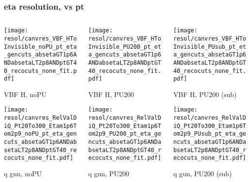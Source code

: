 \documentclass[8pt]{beamer}
\begin{document}
  \begin{frame}
  \frametitle{eta resolution, vs pt}
  
  \begin{columns}
   \begin{column}{0.35\textwidth}
     \texttt{[image: resol/canvres\_VBF\_HToInvisible\_noPU\_pt\_eta\_gencuts\_absetaGT1p6ANDabsetaLT2p8ANDptGT40\_recocuts\_none\_fit.pdf]}
     
     VBF H, noPU
    
     \texttt{[image: resol/canvres\_RelValDiQ\_Pt20To300\_Etam1p6Tom2p9\_noPU\_pt\_eta\_gencuts\_absetaGT1p6ANDabsetaLT2p8ANDptGT40\_recocuts\_none\_fit.pdf]}
     
     q gun, noPU
   \end{column}
   \begin{column}{0.35\textwidth}
     \texttt{[image: resol/canvres\_VBF\_HToInvisible\_PU200\_pt\_eta\_gencuts\_absetaGT1p6ANDabsetaLT2p8ANDptGT40\_recocuts\_none\_fit.pdf]}
     
     VBF H, PU200
    
     \texttt{[image: resol/canvres\_RelValDiQ\_Pt20To300\_Etam1p6Tom2p9\_PU200\_pt\_eta\_gencuts\_absetaGT1p6ANDabsetaLT2p8ANDptGT40\_recocuts\_none\_fit.pdf]}
     
     q gun, PU200
   \end{column}
   \begin{column}{0.35\textwidth}
     \texttt{[image: resol/canvres\_VBF\_HToInvisible\_PUsub\_pt\_eta\_gencuts\_absetaGT1p6ANDabsetaLT2p8ANDptGT40\_recocuts\_none\_fit.pdf]}
     
     VBF H, PU200 (sub)
    
     \texttt{[image: resol/canvres\_RelValDiQ\_Pt20To300\_Etam1p6Tom2p9\_PUsub\_pt\_eta\_gencuts\_absetaGT1p6ANDabsetaLT2p8ANDptGT40\_recocuts\_none\_fit.pdf]}
     
     q gun, PU200 (sub)
   \end{column}
  \end{columns}
 \end{frame}
 
\end{document}

